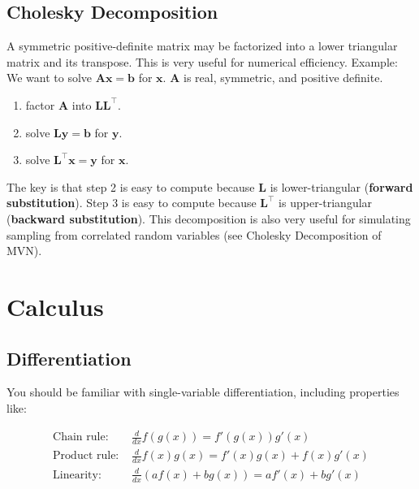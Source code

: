 \documentclass{harvardml}
\theoremstyle{definition}
\theoremstyle{plain}
\begin{document}
    \subsection{Cholesky Decomposition}
        A symmetric positive-definite matrix may be factorized into
        a lower triangular matrix and its transpose.
        This is very useful for numerical efficiency. Example:
        We want to solve $\mathbf{Ax} = \mathbf{b}$ for $\mathbf{x}$. 
        $\mathbf{A}$ is real, symmetric, and positive definite. 
            \begin{enumerate}
                \item factor $\mathbf{A}$ into $\mathbf{L}\mathbf{L}^\top$. 
                \item solve $\mathbf{Ly} = \mathbf{b}$ for $\mathbf{y}$. 
                \item solve $\mathbf{L}^\top\mathbf{x} = \mathbf{y}$
                        for $\mathbf{x}$.
            \end{enumerate}
       The key is that step 2 is easy to compute because $\mathbf{L}$
       is lower-triangular (\textbf{forward substitution}). Step 3 is 
       easy to compute because $\mathbf{L}^\top$ is upper-triangular 
       (\textbf{backward substitution}). This decomposition is also
	   very useful for simulating sampling from correlated random variables
	   (see Cholesky Decomposition of MVN).
\newpage

\section{Calculus}
    \subsection{Differentiation}
        
            You should be familiar with single-variable differentiation,
            including properties like:

            \begin{align*}
                \text{Chain rule: } & \frac{d}{d x} f(g(x))= 
				f'(g(x))g'(x)\\
                \text{Product rule: }& \frac{d}{d x} f(x)g(x) = 
				f'(x)g(x) + f(x)g'(x)\\
                \text{Linearity: }& \frac{d}{d x} (af(x) + bg(x)) = 
				af'(x) + bg'(x)
            \end{align*}
\end{document}
